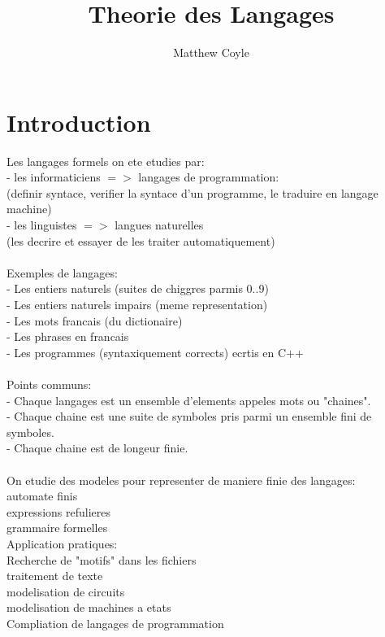 \documentclass{article}
\author{Matthew Coyle}
\title{Theorie des Langages}
\begin{document}
\maketitle

\section{Introduction}

Les langages formels on ete etudies par:\\
- les informaticiens $=>$ langages de programmation:\\
(definir syntace, verifier la syntace d'un programme, le traduire en langage machine)\\
- les linguistes $=>$ langues naturelles\\
(les decrire et essayer de les traiter automatiquement)\\
\\
Exemples de langages:\\ 
- Les entiers naturels (suites de chiggres parmis 0..9)\\
- Les entiers naturels impairs (meme representation)\\
- Les mots francais (du dictionaire)\\
- Les phrases en francais\\
- Les programmes (syntaxiquement corrects) ecrtis en C++\\
\\
Points communs:\\
- Chaque langages est un ensemble d'elements appeles mots ou "chaines".\\
- Chaque chaine est une suite de symboles pris parmi un ensemble fini de symboles.\\
- Chaque chaine est de longeur finie.\\
\\
On etudie des modeles pour representer de maniere finie des langages:\\
automate finis\\
expressions refulieres\\
grammaire formelles\\

Application pratiques:\\
Recherche de "motifs" dans les fichiers\\
traitement de texte\\
modelisation de circuits\\
modelisation de machines a etats\\
Compliation de langages de programmation\\
\\
\end{document}
